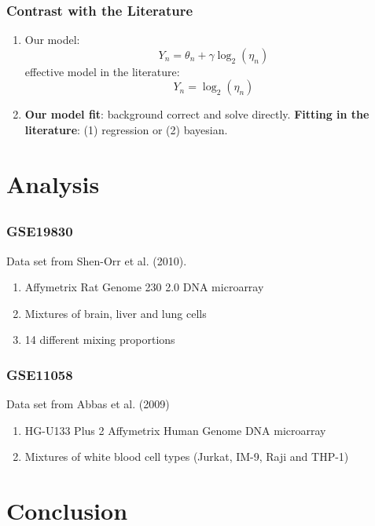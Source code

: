 \documentclass{beamer}
\begin{document}
\begin{frame}
  \frametitle{Contrast with the Literature}
  \begin{enumerate}
  \item Our model:
    \[
Y_n = \theta_n + \gamma \log_2\left(\eta_n\right)
\]
effective model in the literature:
\[
Y_n = \log_2\left(\eta_n\right)
\]
\item {\bf Our model fit}: background correct and solve directly.\newline
  {\bf Fitting in the literature}: (1) regression or (2) bayesian.
  \end{enumerate}
\end{frame}

\setcounter{subsection}{0}
\section{Analysis}
\subsection{}
\begin{frame}
  \frametitle{}
  \begin{center}
  {\color{blue}{\Huge
      Data Analysis
  }}
  \end{center}
\end{frame}

\begin{frame}
  \frametitle{GSE19830}
  Data set from Shen-Orr et al. (2010).
  \begin{enumerate}
  \item Affymetrix Rat Genome 230 2.0 DNA microarray
  \item Mixtures of brain, liver and lung cells
  \item 14 different mixing proportions
  \end{enumerate}
\end{frame}

\begin{frame}
  \frametitle{GSE11058}
  Data set from Abbas et al. (2009)
  \begin{enumerate}
  \item HG-U133 Plus 2 Affymetrix Human Genome DNA
microarray
  \item Mixtures of white blood cell types (Jurkat, IM-9, Raji and THP-1)
  \end{enumerate}
\end{frame}


\section{Conclusion}
\end{document}
